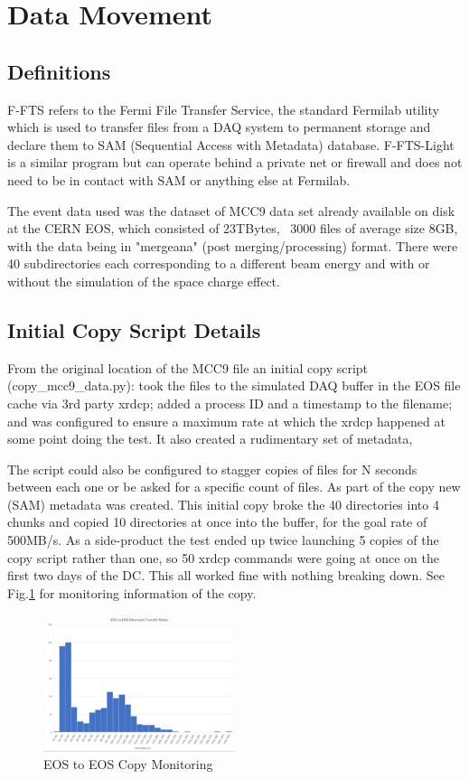\documentclass[pdftex,12pt,letter]{article}
\begin{document}
\section {Data Movement}
\subsection {Definitions}
F-FTS refers to the Fermi File Transfer Service, the standard Fermilab utility which is used to transfer files from a DAQ system to permanent storage and declare them to SAM (Sequential Access with Metadata) database.  F-FTS-Light is a similar program but can operate behind a private net or firewall and does not need to be in contact with SAM or anything else at Fermilab.

The event data used was the dataset of MCC9 data set already available on disk at the CERN EOS, which consisted of
23TBytes,  ~3000 files of average size 8GB, with the data being in  "mergeana" (post merging/processing)  format. There were 
40 subdirectories each corresponding to a different beam energy and with or without the simulation of the space charge effect.

\subsection{Initial Copy Script Details}
From the original location of the MCC9 file  an initial copy script (copy\_mcc9\_data.py): took the files to the simulated DAQ buffer in the EOS file cache via 3rd party xrdcp; added a process ID and a timestamp to the filename; and was configured to ensure a maximum rate at which the xrdcp happened at some point doing the test. It also created a rudimentary set of metadata,

The script could also be configured to stagger copies of files for N seconds between each one or be asked for a specific  count of files. As part of the copy new (SAM) metadata was created. This initial copy broke the 40 directories into 4 chunks and copied 10 directories at once into the buffer, for the goal rate of 500MB/s. As a side-product the test ended up twice launching 5 copies of the copy script rather than one, so 50 xrdcp commands were going at once on the first two days of the DC. This all worked fine with nothing breaking down. See Fig.\ref{fig:EOStoEOS} for monitoring information of the copy. 


\begin{figure}[tbh]
  \centering
  \includegraphics[width=0.5\textwidth]{./ReportImages/EOStoEOS.jpg}
  \caption{EOS to EOS Copy Monitoring}
  \label{fig:EOStoEOS}
\end{figure}
\end{document}

